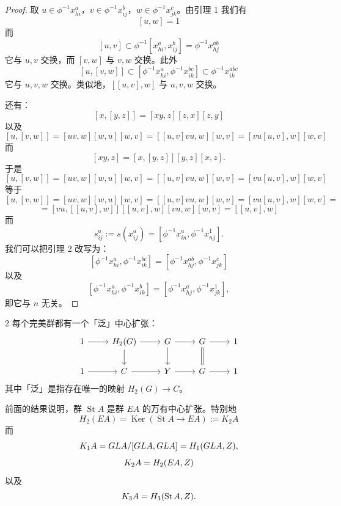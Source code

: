 \begin{proof}
取 $u\in\phi^{-1}x_{hi}^a$，$v\in\phi^{-1}x_{ij}^b$，$w\in\phi^{-1}x_{jk}^c$。由引理 1 我们有
\[
  [u,w] = 1
\]
而
\[
  [u,v] \subset \phi^{-1}[x_{hi}^a, x_{ij}^b] = \phi^{-1}x_{hj}^{ab}
\]
它与 $u,v$ 交换，而 $[v,w]$ 与 $v,w$ 交换。此外
\[
  [u,[v,w]] \subset [\phi^{-1}x_{hi}^a, \phi^{-1}x_{ik}^{bc}] \subset \phi^{-1}x_{ik}^{abc}
\]
它与 $u,v,w$ 交换。类似地，$[[u,v],w]$ 与 $u,v,w$ 交换。

还有：
\[
  [x,[y,z]] = [xy,z][z,x][z,y]
\]
以及
\[
  [u,[v,w]] = [uv,w][w,u][w,v] = [[u,v]vu,w][w,v] = [vu[u,v],w][w,v]
\]
而
\[
  [xy,z] = [x,[y,z]][y,z][x,z].
\]
于是
\[
  [u,[v,w]] = [uv,w][w,u][w,v] = [[u,v]vu,w][w,v] = [vu[u,v],w][w,v]
\]
等于
\[
  [u,[v,w]] = [uv,w][w,u][w,v] = [[u,v]vu,w][w,v] = [vu[u,v],w][w,v] =
\]
\[
  = [vu,[[u,v],w]][[u,v],w][vu,w][w,v] = [[u,v],w]
\]
而
\[
  s_{ij}^a := s(x_{ij}^a) = [\phi^{-1}x_{in}^a, \phi^{-1}x_{nj}^1].
\]
我们可以把引理 2 改写为：
\[
  [\phi^{-1}x_{hi}^a, \phi^{-1}x_{ik}^{bc}] = [\phi^{-1}x_{hj}^{ab}, \phi^{-1}x_{jk}^c]
\]
以及
\[
  [\phi^{-1}x_{hi}^a, \phi^{-1}x_{ik}^b] = [\phi^{-1}x_{hj}^a, \phi^{-1}x_{jk}^1],
\]
即它与 $n$ 无关。
\end{proof}

\begin{thm}{2}
每个完美群都有一个「泛」中心扩张：
\[
  \begin{tikzcd}
    1 \arrow[r] & H_2(G) \arrow[r] \arrow[d] & \wt G \arrow[r] \arrow[d] & G \arrow[r] \arrow[d, equal] & 1 \\
    1 \arrow[r] & C \arrow[r] & Y \arrow[r] & G \arrow[r] & 1
  \end{tikzcd}
\]
其中「泛」是指存在唯一的映射 $H_2(G) \to C$。
\end{thm}

前面的结果说明，群 $\operatorname{St}A$ 是群 $EA$ 的万有中心扩张。特别地
\[
  H_2(EA) = \operatorname{Ker}(\operatorname{St}A \to EA) := K_2A
\]
而
\[
  K_1A = GL A/[GL A,GL A] = H_1(GL A,Z),
\]
\[
  K_2A = H_2(EA,Z)
\]
以及
\[
  K_3A = H_3(\operatorname{St}A,Z).
\]



